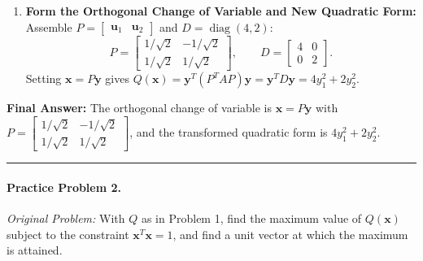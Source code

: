 \documentclass[11pt, letterpaper]{article}
\theoremstyle{definition}
\theoremstyle{remark}
\begin{document}
\begin{enumerate}[leftmargin=2em]
\begin{itemize}
\[        \]
        Choosing $x_2 = 1$ gives $\mathbf{v}_2 = \begin{bmatrix} -1 \\ 1 \end{bmatrix}$ with norm $\|\mathbf{v}_2\| = \sqrt{(-1)^2 + 1^2} = \sqrt{2}$. Normalizing yields $\mathbf{u}_2 = \begin{bmatrix} -1/\sqrt{2} \\ 1/\sqrt{2} \end{bmatrix}$.
    \end{itemize}
    \item \textbf{Form the Orthogonal Change of Variable and New Quadratic Form:}
    Assemble $P = \begin{bmatrix} \mathbf{u}_1 & \mathbf{u}_2 \end{bmatrix}$ and $D = \operatorname{diag}(4, 2)$:
    \[
    P = \begin{bmatrix} 1/\sqrt{2} & -1/\sqrt{2} \\ 1/\sqrt{2} & 1/\sqrt{2} \end{bmatrix}, \qquad D = \begin{bmatrix} 4 & 0 \\ 0 & 2 \end{bmatrix}.
    \]
    Setting $\mathbf{x} = P\mathbf{y}$ gives $Q(\mathbf{x}) = \mathbf{y}^T (P^T A P) \mathbf{y} = \mathbf{y}^T D \mathbf{y} = 4y_1^2 + 2y_2^2$.
\end{enumerate}
\textbf{Final Answer:} The orthogonal change of variable is $\mathbf{x} = P\mathbf{y}$ with $P = \begin{bmatrix} 1/\sqrt{2} & -1/\sqrt{2} \\ 1/\sqrt{2} & 1/\sqrt{2} \end{bmatrix}$, and the transformed quadratic form is $4y_1^2 + 2y_2^2$.

\medskip
\hrule
\medskip

\paragraph{Practice Problem 2.}
\emph{Original Problem:} With $Q$ as in Problem 1, find the maximum value of $Q(\mathbf{x})$ subject to the constraint $\mathbf{x}^T \mathbf{x} = 1$, and find a unit vector at which the maximum is attained.
\end{document}

